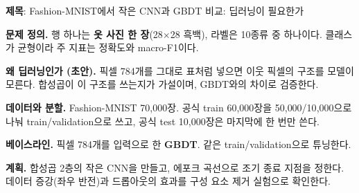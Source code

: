 \documentclass[11pt]{article}
\begin{document}


\noindent\textbf{제목}: Fashion-MNIST에서 작은 CNN과 GBDT 비교: 딥러닝이 필요한가

\vspace{4pt}
\noindent\textbf{문제 정의.} 행 하나는 \textbf{옷 사진 한 장}(28$\times$28 흑백), 라벨은 10종류 중 하나이다. 클래스가 균형이라 주 지표는 정확도와 macro-F1이다.

\noindent\textbf{왜 딥러닝인가 (초안).} 픽셀 784개를 그대로 표처럼 넣으면 이웃 픽셀의 구조를 모델이 모른다. 합성곱이 이 구조를 쓰는지가 가설이며, GBDT와의 차이로 검증한다.

\noindent\textbf{데이터와 분할.} Fashion-MNIST 70{,}000장. 공식 train 60{,}000장을 50{,}000/10{,}000으로 나눠 train/validation으로 쓰고, 공식 test 10{,}000장은 마지막에 한 번만 쓴다.

\noindent\textbf{베이스라인.} 픽셀 784개를 입력으로 한 \textbf{GBDT}. 같은 train/validation으로 튜닝한다.

\noindent\textbf{계획.} 합성곱 2층의 작은 CNN을 만들고, 에포크 곡선으로 조기 종료 지점을 정한다. 데이터 증강(좌우 반전)과 드롭아웃의 효과를 구성 요소 제거 실험으로 확인한다.
\end{document}
